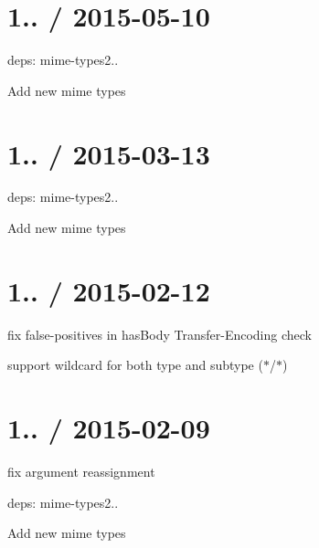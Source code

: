 \section*{1.. / 2015-\/05-\/10 }


\begin{DoxyItemize}
\item deps\+: mime-\/types2..
\begin{DoxyItemize}
\item Add new mime types
\end{DoxyItemize}
\end{DoxyItemize}

\section*{1.. / 2015-\/03-\/13 }


\begin{DoxyItemize}
\item deps\+: mime-\/types2..
\begin{DoxyItemize}
\item Add new mime types
\end{DoxyItemize}
\end{DoxyItemize}

\section*{1.. / 2015-\/02-\/12 }


\begin{DoxyItemize}
\item fix false-\/positives in {\ttfamily has\+Body} {\ttfamily Transfer-\/\+Encoding} check
\item support wildcard for both type and subtype ({\ttfamily $\ast$/$\ast$})
\end{DoxyItemize}

\section*{1.. / 2015-\/02-\/09 }


\begin{DoxyItemize}
\item fix argument reassignment
\item deps\+: mime-\/types2..
\begin{DoxyItemize}
\item Add new mime types
\end{DoxyItemize}
\end{DoxyItemize}

